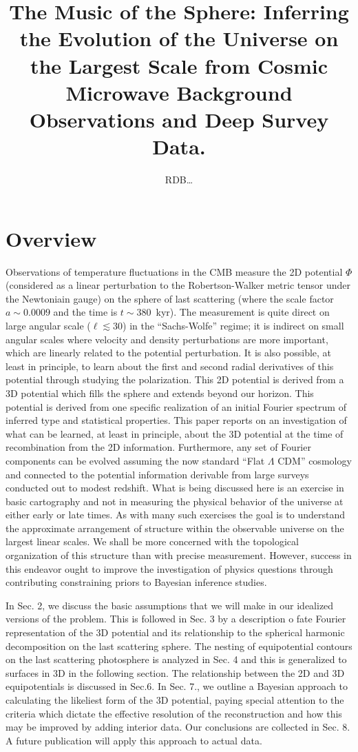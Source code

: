 \documentclass[12pt]{article}
\title{The Music of the Sphere: Inferring the Evolution of the Universe on the Largest Scale from Cosmic Microwave Background Observations and Deep Survey Data.}
\author{RDB\dots}
\begin{document}
\maketitle
\section{Overview}
Observations of temperature fluctuations in the CMB measure the 2D potential $\Phi$ (considered as a linear perturbation to the Robertson-Walker metric tensor under the Newtoniain gauge) on the sphere of last scattering (where the scale factor $a\sim0.0009$ and the time is $t\sim380$~kyr). The measurement is quite direct on large angular scale ($\ell\lesssim30$) in the ``Sachs-Wolfe'' regime; it is indirect on small angular scales where velocity and density perturbations are more important, which are linearly related to the potential perturbation. It is also possible, at least in principle, to learn about the first and second radial derivatives of this potential through studying the polarization. This 2D potential is derived from a 3D potential which fills the sphere and extends beyond our horizon. This potential is derived from one specific realization of an initial Fourier spectrum of inferred type and statistical properties.  This paper reports on an investigation of what can be learned, at least in principle, about the 3D potential at the time of recombination from the 2D information. Furthermore, any set of Fourier components can be evolved assuming the now standard ``Flat $\Lambda$ CDM'' cosmology and connected to the potential information derivable from large surveys conducted out to modest redshift. What is being discussed here is an exercise in basic cartography and not in measuring the physical behavior of the universe at either early or late times. As with many such exercises the goal is to understand the approximate arrangement of structure within the observable universe on the largest linear scales. We shall be more concerned with the topological organization of this structure than with precise measurement. However, success in this endeavor ought to improve the investigation of physics questions through contributing constraining priors to Bayesian inference studies.

In Sec. 2, we discuss the basic assumptions that we will make in our idealized versions of the problem. This is followed in Sec. 3 by a description o fate Fourier representation of the 3D potential and its relationship to the spherical harmonic decomposition on the last scattering sphere. The nesting of equipotential contours on the last scattering photosphere is analyzed in Sec. 4 and this is generalized to surfaces in 3D in the following section.  The relationship between the 2D and 3D equipotentials is discussed in Sec.6. In Sec. 7., we outline a Bayesian approach to calculating the likeliest form of the 3D potential, paying special attention to the criteria which dictate the effective resolution of the reconstruction and how this may be improved by adding interior data. Our conclusions are collected in Sec. 8. A future publication will apply this approach to actual data. 
\end{document}
